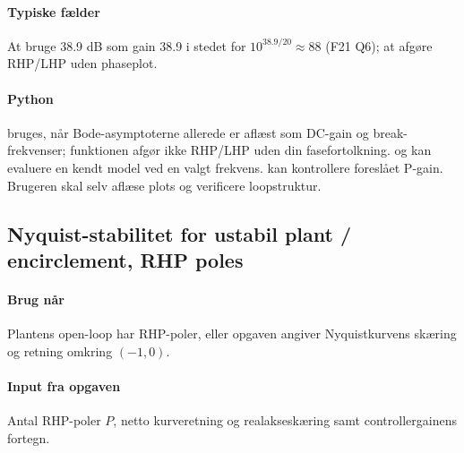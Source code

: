 \paragraph{Typiske fælder}
At bruge 38.9 dB som gain 38.9 i stedet for \(10^{38.9/20}\approx88\) (F21 Q6);
at afgøre RHP/LHP uden phaseplot.

\paragraph{Python}
 bruges, når Bode-asymptoterne
allerede er aflæst som DC-gain og break-frekvenser; funktionen afgør ikke RHP/LHP uden
din fasefortolkning.  og
 kan evaluere en kendt model ved en
valgt frekvens.  kan kontrollere foreslået P-gain.
Brugeren skal selv aflæse plots og verificere loopstruktur.

\subsection{Nyquist-stabilitet for ustabil plant / encirclement, RHP poles}
\label{sec:nyquist}

\paragraph{Brug når}
Plantens open-loop har RHP-poler, eller opgaven angiver Nyquistkurvens skæring
og retning omkring \((-1,0)\).

\paragraph{Input fra opgaven}
Antal RHP-poler \(P\), netto kurveretning og realakseskæring samt controllergainens fortegn.

